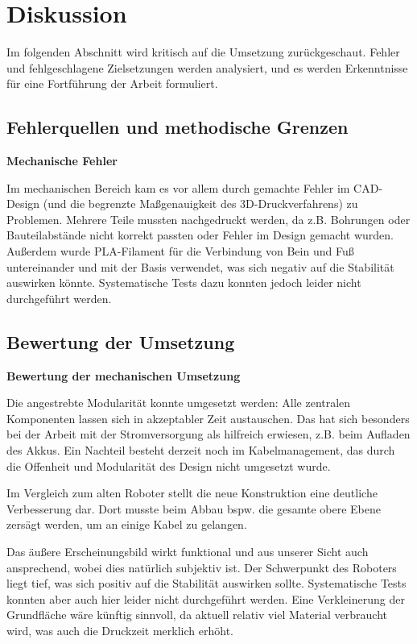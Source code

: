 \section{Diskussion}
\label{sec:diskussion}

Im folgenden Abschnitt wird kritisch auf die Umsetzung zurückgeschaut. Fehler und fehlgeschlagene Zielsetzungen werden analysiert, und es werden Erkenntnisse für eine Fortführung der Arbeit formuliert.

\subsection{Fehlerquellen und methodische Grenzen}

\textbf{Mechanische Fehler}

Im mechanischen Bereich kam es vor allem durch gemachte Fehler im CAD-Design (und die begrenzte Maßgenauigkeit des 3D-Druckverfahrens) zu Problemen. Mehrere Teile mussten nachgedruckt werden, da z.B. Bohrungen oder Bauteilabstände nicht korrekt passten oder Fehler im Design gemacht wurden. 
Außerdem wurde PLA-Filament für die Verbindung von Bein und Fuß untereinander und mit der Basis verwendet, was sich negativ auf die Stabilität auswirken könnte. Systematische Tests dazu konnten jedoch leider nicht durchgeführt werden.

\subsection{Bewertung der Umsetzung}

\textbf{Bewertung der mechanischen Umsetzung}

Die angestrebte Modularität konnte umgesetzt werden: Alle zentralen Komponenten lassen sich in akzeptabler Zeit austauschen. Das hat sich besonders bei der Arbeit mit der Stromversorgung als hilfreich erwiesen, z.B. beim Aufladen des Akkus. Ein Nachteil besteht derzeit noch im Kabelmanagement, das durch die Offenheit und Modularität des Design nicht umgesetzt wurde.

Im Vergleich zum alten Roboter stellt die neue Konstruktion eine deutliche Verbesserung dar. Dort musste beim Abbau bspw. die gesamte obere Ebene zersägt werden, um an einige Kabel zu gelangen.

Das äußere Erscheinungsbild wirkt funktional und aus unserer Sicht auch ansprechend, wobei dies natürlich subjektiv ist. Der Schwerpunkt des Roboters liegt tief, was sich positiv auf die Stabilität auswirken sollte. Systematische Tests konnten aber auch hier leider nicht durchgeführt werden. Eine Verkleinerung der Grundfläche wäre künftig sinnvoll, da aktuell relativ viel Material verbraucht wird, was auch die Druckzeit merklich erhöht. 

